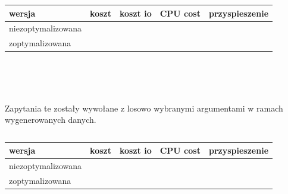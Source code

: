 \documentclass[11pt]{article}
\numberwithin{figure}{subsection}
\begin{document}
		\begin{tabularx}{\textwidth}{|X|X|X|X|X|}
			\hline
			wersja & koszt & koszt io & CPU cost & przyspieszenie \\
			\hline
			niezoptymalizowana &  &  &  &  \\
			\hline
			zoptymalizowana &  &  &  &  \\
			\hline
		\end{tabularx}
		
		\begin{tabularx}{\textwidth}{|X|X|X|X|X|X|}
		\end{tabularx}
		
		\begin{tabularx}{\textwidth}{|X|X|X|X|X|X|}
		\end{tabularx}
		
		
		
		
		
		
		
		
		
		
		
	
	\subsection{}
			
		\begin{lstlisting}[caption={Wersja niezoptymalizowana},captionpos=b]
		\end{lstlisting}
			
		\begin{lstlisting}[caption={Wersja zoptymalizowana},captionpos=b]
		\end{lstlisting}
		
		Zapytania te zostały wywołane z losowo wybranymi argumentami w ramach
		wygenerowanych danych. \\
		
		\begin{lstlisting}[caption={Wywołanie zapytań}, captionpos=b]
		\end{lstlisting}
		
		\begin{tabularx}{\textwidth}{|X|X|X|X|X|}
			\hline
			wersja & koszt & koszt io & CPU cost & przyspieszenie \\
			\hline
			niezoptymalizowana &  &  &  &  \\
			\hline
			zoptymalizowana &  &  &  &  \\
			\hline
		\end{tabularx}
		
		\begin{tabularx}{\textwidth}{|X|X|X|X|X|X|}
		\end{tabularx}
		
\end{document}
